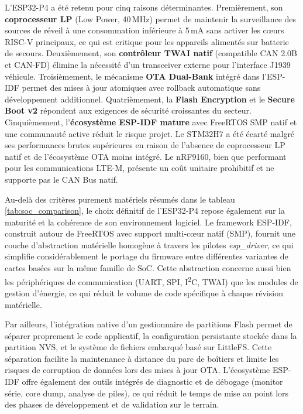 L'ESP32-P4 a été retenu pour cinq raisons déterminantes. Premièrement,
son \textbf{coprocesseur LP} (Low Power, 40\,MHz) permet de maintenir
la surveillance des sources de réveil à une consommation inférieure
à 5\,mA sans activer les cœurs RISC-V principaux, ce qui est critique
pour les appareils alimentés sur batterie de secours. Deuxièmement,
son \textbf{contrôleur TWAI natif} (compatible CAN 2.0B et CAN-FD)
élimine la nécessité d'un transceiver externe pour l'interface J1939
véhicule. Troisièmement, le mécanisme \textbf{OTA Dual-Bank} intégré
dans l'ESP-IDF permet des mises à jour atomiques avec rollback
automatique sans développement additionnel. Quatrièmement, la
\textbf{Flash Encryption} et le \textbf{Secure Boot v2} répondent
aux exigences de sécurité croissantes du secteur. Cinquièmement,
l'\textbf{écosystème ESP-IDF mature} avec FreeRTOS SMP natif et une
communauté active réduit le risque projet.
\newpage
Le STM32H7 a été écarté malgré ses performances brutes supérieures
en raison de l'absence de coprocesseur LP natif et de l'écosystème
OTA moins intégré. Le nRF9160, bien que performant pour les
communications LTE-M, présente un coût unitaire prohibitif et ne
supporte pas le CAN Bus natif.

Au-delà des critères purement matériels résumés dans le tableau
\ref{tab:soc_comparison}, le choix définitif de l'ESP32-P4 repose
également sur la maturité et la cohérence de son environnement
logiciel. Le framework ESP-IDF, construit autour de FreeRTOS avec
support multi-cœur natif (SMP), fournit une couche d'abstraction
matérielle homogène à travers les pilotes \textit{esp\_driver}, ce
qui simplifie considérablement le portage du firmware entre
différentes variantes de cartes basées sur la même famille de SoC.
Cette abstraction concerne aussi bien les périphériques de
communication (UART, SPI, I\textsuperscript{2}C, TWAI) que les
modules de gestion d'énergie, ce qui réduit le volume de code
spécifique à chaque révision matérielle.

Par ailleurs, l'intégration native d'un gestionnaire de partitions
Flash permet de séparer proprement le code applicatif, la
configuration persistante stockée dans la partition NVS, et le
système de fichiers embarqué basé sur LittleFS. Cette séparation
facilite la maintenance à distance du parc de boîtiers et limite les
risques de corruption de données lors des mises à jour OTA.
L'écosystème ESP-IDF offre également des outils intégrés de
diagnostic et de débogage (monitor série, core dump, analyse de
piles), ce qui réduit le temps de mise au point lors des phases de
développement et de validation sur le terrain.

